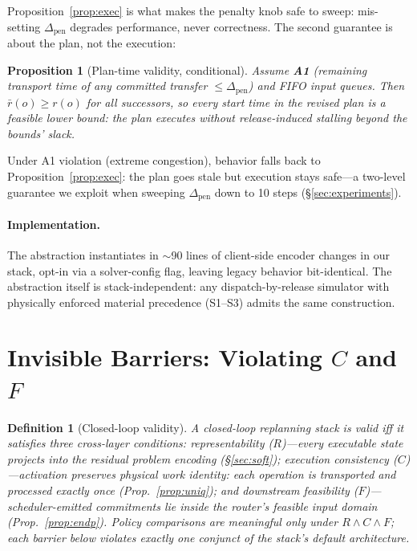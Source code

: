 \documentclass[twocolumn]{article}
\newtheorem{definition}{Definition}
\newtheorem{proposition}{Proposition}
\begin{document}
Proposition~\ref{prop:exec} is what makes the penalty knob safe to
sweep: mis-setting $\Delta_{\mathrm{pen}}$ degrades performance, never
correctness. The second guarantee is about the plan, not the execution:

\begin{proposition}[Plan-time validity, conditional]
\label{prop:plan}
Assume \textbf{A1} (remaining transport time of any committed transfer
$\le\Delta_{\mathrm{pen}}$) and FIFO input queues. Then
$\bar r(o)\ge r(o)$ for all successors, so every start time in the
revised plan is a feasible lower bound: the plan executes without
release-induced stalling beyond the bounds' slack.
\end{proposition}

Under A1 violation (extreme congestion), behavior falls back to
Proposition~\ref{prop:exec}: the plan goes stale but execution stays
safe---a two-level guarantee we exploit when sweeping
$\Delta_{\mathrm{pen}}$ down to 10 steps (\S\ref{sec:experiments}).

\paragraph{Implementation.}
The abstraction instantiates in $\sim$90 lines of client-side encoder
changes in our stack, opt-in via a solver-config flag, leaving legacy
behavior bit-identical. The abstraction itself is stack-independent:
any dispatch-by-release simulator with physically enforced material
precedence (S1--S3) admits the same construction.

\section{Invisible Barriers: Violating $C$ and $F$}
\label{sec:exec}
\begin{definition}[Closed-loop validity]
\label{def:validity}
A closed-loop replanning stack is \emph{valid} iff it satisfies three
cross-layer conditions: \emph{representability} ($R$)---every
executable state projects into the residual problem encoding
(\S\ref{sec:soft}); \emph{execution consistency} ($C$)---activation
preserves physical work identity: each operation is transported and
processed exactly once (Prop.~\ref{prop:uniq}); and \emph{downstream
feasibility} ($F$)---scheduler-emitted commitments lie inside the
router's feasible input domain (Prop.~\ref{prop:endp}). Policy
comparisons are meaningful only under $R \land C \land F$; each
barrier below violates exactly one conjunct of the stack's default
architecture.
\end{definition}
\end{document}
